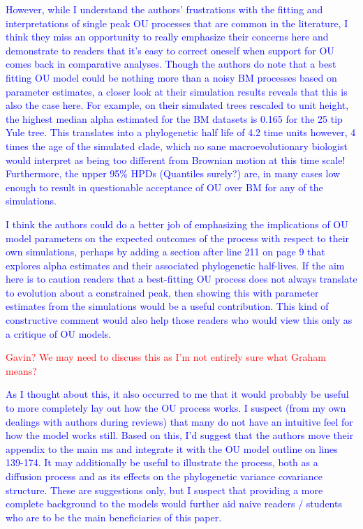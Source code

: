 \documentclass[12pt]{letter}
\begin{document}
\begin{letter}{}
\textcolor{blue}{However, while I understand the authors’ frustrations with the fitting and interpretations of single peak OU processes that are common in the literature, I think they miss an opportunity to really emphasize their concerns here and demonstrate to readers that it's easy to correct oneself when support for OU comes back in comparative analyses. Though the authors do note that a best fitting OU model could be nothing more than a noisy BM processes based on parameter estimates, a closer look at their simulation results reveals that this is also the case here. For example, on their simulated trees rescaled to unit height, the highest median alpha estimated for the BM datasets is 0.165 for the 25 tip Yule tree. This translates into a phylogenetic half life of 4.2 time units however, 4 times the age of the simulated clade, which no sane macroevolutionary biologist would interpret as being too different from Brownian motion at this time scale! Furthermore, the upper 95\% HPDs (Quantiles surely?) are, in many cases low enough to result in questionable acceptance of OU over BM for any of the simulations.}

\textcolor{blue}{I think the authors could do a better job of emphasizing the implications of OU model parameters on the expected outcomes of the process with respect to their own simulations, perhaps by adding a section after line 211 on page 9 that explores alpha estimates and their associated phylogenetic half-lives. If the aim here is to caution readers that a best-fitting OU process does not always translate to evolution about a constrained peak, then showing this with parameter estimates from the simulations would be a useful contribution. This kind of constructive comment would also help those readers who would view this only as a critique of OU models.}

\textcolor{red}{Gavin? We may need to discuss this as I'm not entirely sure what Graham means?}

\textcolor{blue}{As I thought about this, it also occurred to me that it would probably be useful to more completely lay out how the OU process works. I suspect (from my own dealings with authors during reviews) that many do not have an intuitive feel for how the model works still. Based on this, I'd suggest that the authors move their appendix to the main ms and integrate it with the OU model outline on lines 139-174. It may additionally be useful to illustrate the process, both as a diffusion process and as its effects on the phylogenetic variance covariance structure. These are suggestions only, but I suspect that providing a more complete background to the models would further aid naive readers / students who are to be the main beneficiaries of this paper.}


\end{letter}
\end{document}
